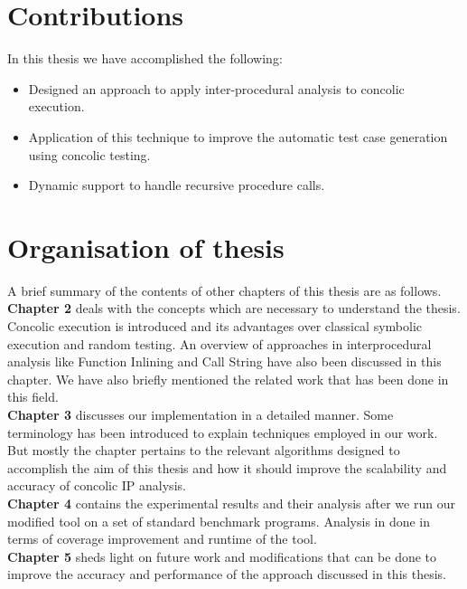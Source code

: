 \documentclass[12pt,oneside]{book}
\begin{document}

\section {Contributions}
In this thesis we have accomplished the following:
\begin{itemize}
  \item Designed an approach to apply inter-procedural analysis to concolic execution. 
  \item Application of this technique to improve the automatic test case generation using concolic testing.
  \item Dynamic support to handle recursive procedure calls. 
\end{itemize}


\section {Organisation of thesis}
A brief summary of the contents of other chapters of this thesis are as follows.\\

\textbf{Chapter 2} deals with the concepts which are necessary to understand the thesis. Concolic execution is introduced and its advantages over classical symbolic execution and random testing. An overview of approaches in interprocedural analysis like Function Inlining and Call String have also been discussed in this chapter. We have also briefly mentioned the related work that has been done in this field. \\

\textbf{Chapter 3} discusses our implementation in a detailed manner. Some terminology has been introduced to explain techniques employed in our work. But mostly the chapter pertains to the relevant algorithms designed to accomplish the aim of this thesis and how it should improve the scalability and accuracy of concolic IP analysis.\\

\textbf{Chapter 4} contains the experimental results and their analysis after we run our modified tool on a set of standard benchmark programs. Analysis in done in terms of coverage improvement and runtime of the tool.\\

\textbf{Chapter 5} sheds light on future work and modifications that can be done to improve the accuracy and performance of the approach discussed in this thesis.
\end{document}
